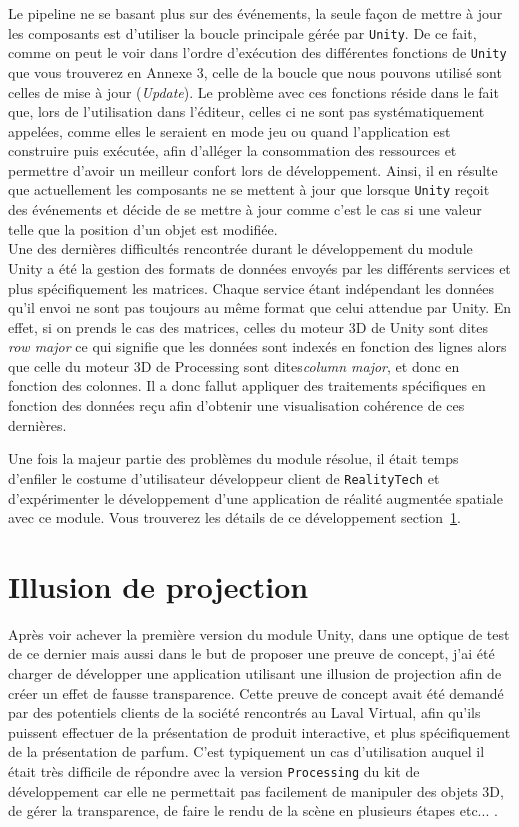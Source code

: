 Le pipeline ne se basant plus sur des événements, la seule façon de mettre à jour les composants est d'utiliser la boucle principale gérée par \texttt{Unity}. De ce fait, comme on peut le voir dans l'ordre d'exécution des différentes fonctions de \texttt{Unity} que vous trouverez en Annexe 3, celle de la boucle que nous pouvons utilisé sont celles de mise à jour (\emph{Update}). Le problème avec ces fonctions réside dans le fait que, lors de l'utilisation dans l'éditeur, celles ci ne sont pas systématiquement appelées, comme elles le seraient en mode jeu ou quand l'application est construire puis exécutée, afin d'alléger la consommation des ressources et permettre d'avoir un meilleur confort lors de développement. Ainsi, il en résulte que actuellement les composants ne se mettent à jour que lorsque \texttt{Unity} reçoit des événements et décide de se mettre à jour comme c'est le cas si une valeur telle que la position d'un objet est modifiée.\\

Une des dernières difficultés rencontrée durant le développement du module Unity a été la gestion des formats de données envoyés par les différents services et plus spécifiquement les matrices. Chaque service étant indépendant les données qu'il envoi ne sont pas toujours au même format que celui attendue par Unity. En effet, si on prends le cas des matrices, celles du moteur 3D de Unity sont dites \emph{row major} ce qui signifie que les données sont indexés en fonction des lignes alors que celle du moteur 3D de Processing sont dites\emph{column major}, et donc en fonction des colonnes. Il a donc fallut appliquer des traitements spécifiques en fonction des données reçu afin d'obtenir une visualisation cohérence de ces dernières.

Une fois la majeur partie des problèmes du module résolue, il était temps d'enfiler le costume d'utilisateur développeur client de \texttt{RealityTech} et d'expérimenter le développement d'une application de réalité augmentée spatiale avec ce module. Vous trouverez les détails de ce développement section~\ref{sec:unity:appli}.

\section{Illusion de projection}
\label{sec:unity:appli}

Après voir achever la première version du module Unity, dans une optique de test de ce dernier mais aussi dans le but de proposer une preuve de concept, j'ai été charger de développer une application utilisant une illusion de projection afin de créer un effet de fausse transparence. Cette preuve de concept avait été demandé par des potentiels clients de la société rencontrés au Laval Virtual, afin qu'ils puissent effectuer de la présentation de produit interactive, et plus spécifiquement de la présentation de parfum. C'est typiquement un cas d'utilisation auquel il était très difficile de répondre avec la version \texttt{Processing} du kit de développement car elle ne permettait pas facilement de manipuler des objets 3D, de gérer la transparence, de faire le rendu de la scène en plusieurs étapes etc... . 

